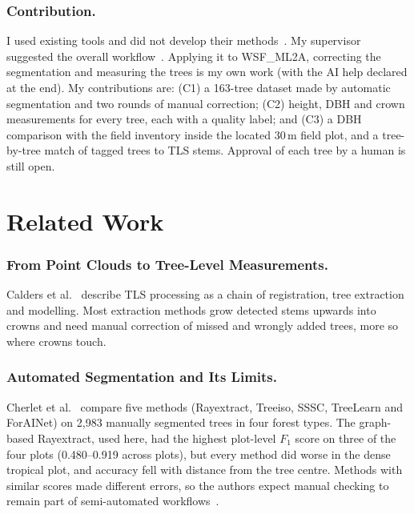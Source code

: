 \documentclass[runningheads]{llncs}
\begin{document}
\subsubsection{Contribution.}
I used existing tools and did not develop their methods~\cite{lowe2021,terryn2023}. My supervisor suggested the overall workflow~\cite{pipeline}. Applying it to WSF\_ML2A, correcting the segmentation and measuring the trees is my own work (with the AI help declared at the end). My contributions are: (C1) a 163-tree dataset made by automatic segmentation and two rounds of manual correction; (C2) height, DBH and crown measurements for every tree, each with a quality label; and (C3) a DBH comparison with the field inventory inside the located 30\,m field plot, and a tree-by-tree match of tagged trees to TLS stems. Approval of each tree by a human is still open.

\section{Related Work}\label{sec:related}

\subsubsection{From Point Clouds to Tree-Level Measurements.}
Calders et al.~\cite{calders2020} describe TLS processing as a chain of registration, tree extraction and modelling. Most extraction methods grow detected stems upwards into crowns and need manual correction of missed and wrongly added trees, more so where crowns touch.

\subsubsection{Automated Segmentation and Its Limits.}
Cherlet et al.~\cite{cherlet2026} compare five methods (Rayextract, Treeiso, SSSC, TreeLearn and ForAINet) on 2,983 manually segmented trees in four forest types. The graph-based Rayextract, used here, had the highest plot-level $F_1$ score on three of the four plots (0.480--0.919 across plots), but every method did worse in the dense tropical plot, and accuracy fell with distance from the tree centre. Methods with similar scores made different errors, so the authors expect manual checking to remain part of semi-automated workflows~\cite{cherlet2026}.
\end{document}
